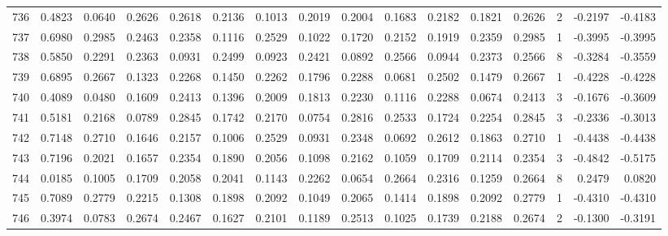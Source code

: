\begin{tabular}{lrrrrrrrrrrrrrrr}
736 &      0.4823 &  0.0640 &  0.2626 &  0.2618 &  0.2136 &  0.1013 &  0.2019 &  0.2004 &  0.1683 &  0.2182 &   0.1821 &     0.2626 &      2 &                   -0.2197 &                    -0.4183 \\
737 &      0.6980 &  0.2985 &  0.2463 &  0.2358 &  0.1116 &  0.2529 &  0.1022 &  0.1720 &  0.2152 &  0.1919 &   0.2359 &     0.2985 &      1 &                   -0.3995 &                    -0.3995 \\
738 &      0.5850 &  0.2291 &  0.2363 &  0.0931 &  0.2499 &  0.0923 &  0.2421 &  0.0892 &  0.2566 &  0.0944 &   0.2373 &     0.2566 &      8 &                   -0.3284 &                    -0.3559 \\
739 &      0.6895 &  0.2667 &  0.1323 &  0.2268 &  0.1450 &  0.2262 &  0.1796 &  0.2288 &  0.0681 &  0.2502 &   0.1479 &     0.2667 &      1 &                   -0.4228 &                    -0.4228 \\
740 &      0.4089 &  0.0480 &  0.1609 &  0.2413 &  0.1396 &  0.2009 &  0.1813 &  0.2230 &  0.1116 &  0.2288 &   0.0674 &     0.2413 &      3 &                   -0.1676 &                    -0.3609 \\
741 &      0.5181 &  0.2168 &  0.0789 &  0.2845 &  0.1742 &  0.2170 &  0.0754 &  0.2816 &  0.2533 &  0.1724 &   0.2254 &     0.2845 &      3 &                   -0.2336 &                    -0.3013 \\
742 &      0.7148 &  0.2710 &  0.1646 &  0.2157 &  0.1006 &  0.2529 &  0.0931 &  0.2348 &  0.0692 &  0.2612 &   0.1863 &     0.2710 &      1 &                   -0.4438 &                    -0.4438 \\
743 &      0.7196 &  0.2021 &  0.1657 &  0.2354 &  0.1890 &  0.2056 &  0.1098 &  0.2162 &  0.1059 &  0.1709 &   0.2114 &     0.2354 &      3 &                   -0.4842 &                    -0.5175 \\
744 &      0.0185 &  0.1005 &  0.1709 &  0.2058 &  0.2041 &  0.1143 &  0.2262 &  0.0654 &  0.2664 &  0.2316 &   0.1259 &     0.2664 &      8 &                    0.2479 &                     0.0820 \\
745 &      0.7089 &  0.2779 &  0.2215 &  0.1308 &  0.1898 &  0.2092 &  0.1049 &  0.2065 &  0.1414 &  0.1898 &   0.2092 &     0.2779 &      1 &                   -0.4310 &                    -0.4310 \\
746 &      0.3974 &  0.0783 &  0.2674 &  0.2467 &  0.1627 &  0.2101 &  0.1189 &  0.2513 &  0.1025 &  0.1739 &   0.2188 &     0.2674 &      2 &                   -0.1300 &                    -0.3191 \\

\end{tabular}

